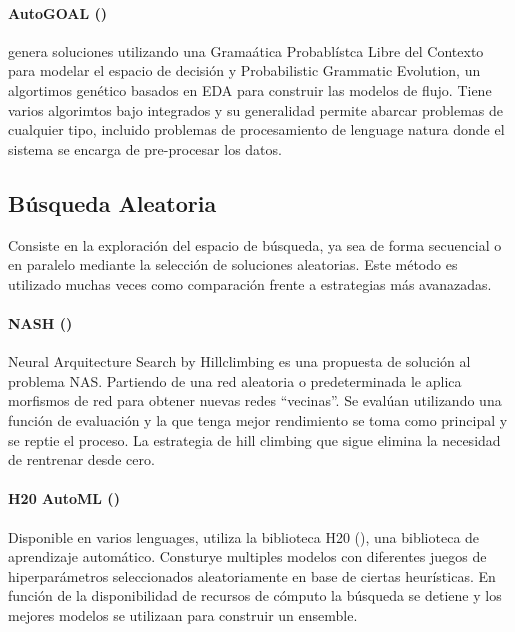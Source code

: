 
     \paragraph{AutoGOAL (\cite{estevez2020solving})} genera soluciones utilizando una Grama\'atica Probabl\'istca Libre del Contexto para modelar el espacio de decisi\'on y Probabilistic Grammatic Evolution, un algortimos gen\'etico basados en EDA para construir las modelos de flujo. Tiene varios algorimtos bajo integrados y su generalidad permite abarcar problemas de cualquier tipo, incluido problemas de procesamiento de lenguage natura donde el sistema se encarga de pre-procesar los datos.


\subsection{B\'usqueda Aleatoria}
Consiste en la exploraci\'on del espacio de b\'usqueda, ya sea de forma secuencial o en paralelo mediante la selecci\'on de soluciones aleatorias. Este m\'etodo es utilizado muchas veces como comparaci\'on frente a estrategias m\'as avanazadas.

\paragraph{NASH (\cite{wei2016network})} Neural Arquitecture Search by Hillclimbing es una propuesta de soluci\'on al problema NAS.
        Partiendo de una red aleatoria o predeterminada le aplica morfismos de red para obtener  nuevas redes ``vecinas''. Se eval\'uan utilizando una funci\'on de evaluaci\'on y la que tenga mejor rendimiento se toma como principal y se reptie el proceso. La estrategia de hill climbing que sigue elimina la necesidad de rentrenar desde cero.

        \paragraph{H20 AutoML (\cite{ledell2020h2o})} Disponible en varios lenguages, utiliza la biblioteca H20 (\cite{boehmke2019hands}), una biblioteca de aprendizaje autom\'atico. Consturye multiples modelos con diferentes juegos de hiperpar\'ametros seleccionados aleatoriamente en base de ciertas heur\'isticas. En funci\'on de la disponibilidad de recursos de c\'omputo la b\'usqueda se detiene y los mejores modelos se utilizaan para construir un ensemble.


